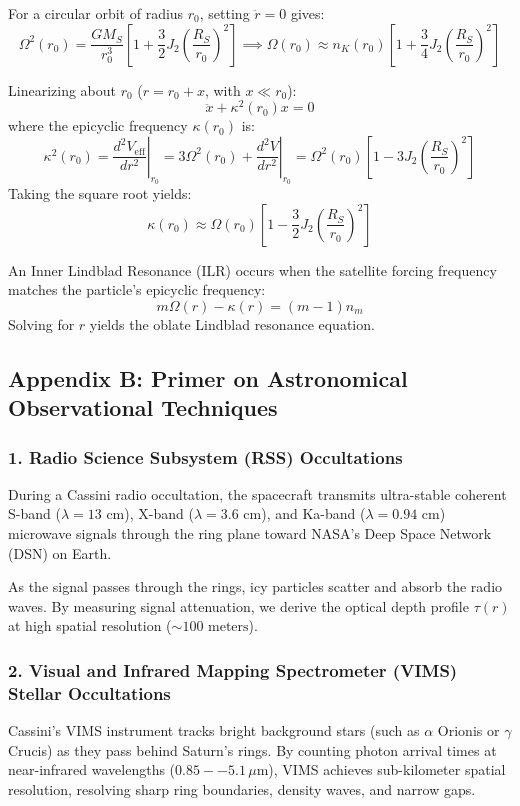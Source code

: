 \documentclass[11pt,a4paper]{article}
\begin{document}
For a circular orbit of radius $r_0$, setting $\ddot{r} = 0$ gives:
\begin{equation}
\Omega^2(r_0) = \frac{G M_S}{r_0^3} \left[ 1 + \frac{3}{2} J_2 \left( \frac{R_S}{r_0} \right)^2 \right] \implies \Omega(r_0) \approx n_K(r_0) \left[ 1 + \frac{3}{4} J_2 \left( \frac{R_S}{r_0} \right)^2 \right]
\end{equation}

Linearizing about $r_0$ ($r = r_0 + x$, with $x \ll r_0$):
\begin{equation}
\ddot{x} + \kappa^2(r_0) x = 0
\end{equation}
where the epicyclic frequency $\kappa(r_0)$ is:
\begin{equation}
\kappa^2(r_0) = \left. \frac{d^2 V_{\text{eff}}}{dr^2} \right|_{r_0} = 3 \Omega^2(r_0) + \left. \frac{d^2 V}{dr^2} \right|_{r_0} = \Omega^2(r_0) \left[ 1 - 3 J_2 \left( \frac{R_S}{r_0} \right)^2 \right]
\end{equation}
Taking the square root yields:
\begin{equation}
\kappa(r_0) \approx \Omega(r_0) \left[ 1 - \frac{3}{2} J_2 \left( \frac{R_S}{r_0} \right)^2 \right]
\end{equation}

An Inner Lindblad Resonance (ILR) occurs when the satellite forcing frequency matches the particle's epicyclic frequency:
\begin{equation}
m \Omega(r) - \kappa(r) = (m-1) n_m
\end{equation}
Solving for $r$ yields the oblate Lindblad resonance equation.

\subsection*{Appendix B: Primer on Astronomical Observational Techniques}

\subsubsection*{1. Radio Science Subsystem (RSS) Occultations}
During a Cassini radio occultation, the spacecraft transmits ultra-stable coherent S-band ($\lambda = 13\text{ cm}$), X-band ($\lambda = 3.6\text{ cm}$), and Ka-band ($\lambda = 0.94\text{ cm}$) microwave signals through the ring plane toward NASA's Deep Space Network (DSN) on Earth. 

As the signal passes through the rings, icy particles scatter and absorb the radio waves. By measuring signal attenuation, we derive the optical depth profile $\tau(r)$ at high spatial resolution ($\sim 100\text{ meters}$).

\subsubsection*{2. Visual and Infrared Mapping Spectrometer (VIMS) Stellar Occultations}
Cassini's VIMS instrument tracks bright background stars (such as $\alpha$ Orionis or $\gamma$ Crucis) as they pass behind Saturn's rings. By counting photon arrival times at near-infrared wavelengths ($0.85--5.1\,\mu$m), VIMS achieves sub-kilometer spatial resolution, resolving sharp ring boundaries, density waves, and narrow gaps.
\end{document}
